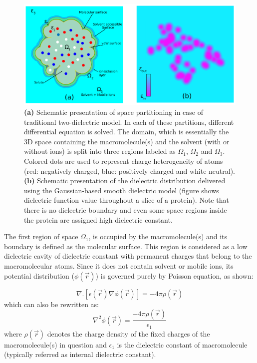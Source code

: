 \documentclass[9pt,tutorial]{livecoms}
\begin{document}
\begin{figure}[hbt!]
\includegraphics[width=0.95\linewidth]{Figure_1.png}
\caption{\textbf{(a)} Schematic presentation of space partitioning in case of traditional two-dielectric model. In each of these partitions, different differential equation is solved. The domain, which is essentially the 3D space containing the macromolecule(s) and the solvent (with or without ions) is split into three regions labeled as $ \Omega_1$, $ \Omega_2 $ and $ \Omega_3 $. Colored dots are used to represent charge heterogeneity of atoms (red: negatively charged, blue: positively charged and white neutral). \textbf{(b)} Schematic presentation of the dielectric distribution delivered using the Gaussian-based smooth dielectric model (figure shows dielectric function value throughout a slice of a protein). Note that there is no dielectric boundary and even some space regions inside the protein are assigned high dielectric constant.}
\label{fig:Figure_1}
\end{figure}

The first region of space $ \Omega_1 $, is occupied by the macromolecule(s) and its boundary is defined as the molecular surface. This region is considered as a low dielectric cavity of dielectric constant with permanent charges that belong to the macromolecular atoms. Since it does not contain solvent or mobile ions, its potential distribution ($\phi(\Vec{r})$) is governed purely by Poisson equation, as shown:

\begin{equation}
 \nabla . \left[ \epsilon(\Vec{r})\nabla\phi(\Vec{r}) \right] = -4\pi\rho(\Vec{r})    
\end{equation} 
which can also be rewritten as:
\begin{equation}
\nabla^2\phi(\Vec{r}) = \frac{-4\pi\rho(\Vec{r})}{\epsilon_1} 
\end{equation}
where $ \rho(\Vec{r}) $ denotes the charge density of the fixed charges of the macromolecule(s) in question and $ \epsilon_1 $ is the dielectric constant of macromolecule (typically referred as internal dielectric constant). 
\end{document}
